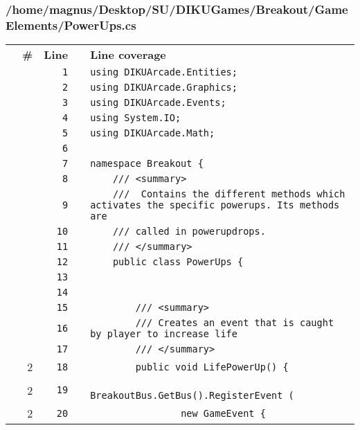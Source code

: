 \documentclass[a4paper,landscape,10pt]{article}
\begin{document}
\subsubsection{/home/magnus/Desktop/SU/DIKUGames/Breakout/GameElements/PowerUps.cs}
\begin{longtable}[l]{lrrll}
\textbf{} & \textbf{\#} & \textbf{Line} & \textbf{} & \textbf{Line coverage}\\
\cellcolor{gray} &  & \verb~1~ & & \verb~using DIKUArcade.Entities;~\\
\cellcolor{gray} &  & \verb~2~ & & \verb~using DIKUArcade.Graphics;~\\
\cellcolor{gray} &  & \verb~3~ & & \verb~using DIKUArcade.Events;~\\
\cellcolor{gray} &  & \verb~4~ & & \verb~using System.IO;~\\
\cellcolor{gray} &  & \verb~5~ & & \verb~using DIKUArcade.Math;~\\
\cellcolor{gray} &  & \verb~6~ & & \verb~~\\
\cellcolor{gray} &  & \verb~7~ & & \verb~namespace Breakout {~\\
\cellcolor{gray} &  & \verb~8~ & & \verb~    /// <summary>~\\
\cellcolor{gray} &  & \verb~9~ & & \verb~    ///  Contains the different methods which activates the specific powerups. Its methods are~\\
\cellcolor{gray} &  & \verb~10~ & & \verb~    /// called in powerupdrops.~\\
\cellcolor{gray} &  & \verb~11~ & & \verb~    /// </summary>~\\
\cellcolor{gray} &  & \verb~12~ & & \verb~    public class PowerUps {~\\
\cellcolor{gray} &  & \verb~13~ & & \verb~~\\
\cellcolor{gray} &  & \verb~14~ & & \verb~~\\
\cellcolor{gray} &  & \verb~15~ & & \verb~        /// <summary>~\\
\cellcolor{gray} &  & \verb~16~ & & \verb~        /// Creates an event that is caught by player to increase life~\\
\cellcolor{gray} &  & \verb~17~ & & \verb~        /// </summary>~\\
\cellcolor{green} & 2 & \verb~18~ & & \verb~        public void LifePowerUp() {~\\
\cellcolor{green} & 2 & \verb~19~ & & \verb~            BreakoutBus.GetBus().RegisterEvent (~\\
\cellcolor{green} & 2 & \verb~20~ & & \verb~                new GameEvent {~\\

\end{longtable}
\end{document}
